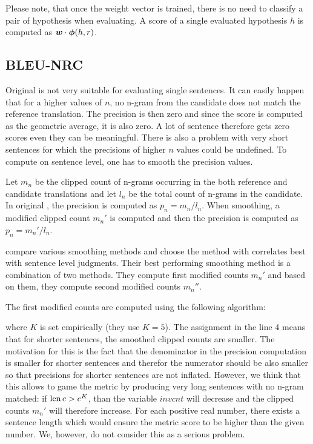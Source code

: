 Please note, that once the weight vector is trained, there is no need to
classify a pair of hypothesis when evaluating. A score of a single evaluated hypothesis $h$
is computed as $\boldsymbol{w} \cdot \boldsymbol{\phi}(h,r)$.



\subsection{BLEU-NRC}

Original  is not very suitable for evaluating single sentences. It
can easily happen that for a higher values of $n$, no n-gram from the candidate
does not match the reference translation. The precision is then zero and since
the  score is computed as the geometric average, it is also zero.
A lot of sentence therefore gets zero scores even they can be meaningful. There
is also a problem with very short sentences for which the precisions of higher
$n$ values could be undefined. To compute  on sentence level, one
has to smooth the precision values.

Let $m_n$ be the clipped count of n-grams occurring in the both reference and
candidate translations and let $l_n$ be the total count of n-grams in the
candidate. In original , the precision is computed as $p_n = m_n /
l_n$. When smoothing, a modified clipped count $m_n'$ is computed and then the
precision is computed as $p_n = m_n' / l_n$. 

 compare various smoothing methods and choose
the method with correlates best with sentence level judgments. Their best
performing smoothing method is a combination of two methods. They compute first
modified counts $m_n'$ and based on them, they compute second modified counts
$m_n''$.

The first modified counts are computed using the following algorithm:
\begin{algorithmic}[1]    
     \Else {} \EndIf \EndFor
\end{algorithmic} where $K$ is set empirically (they use $K = 5$). The
assignment in the line 4 means that for shorter sentences, the smoothed clipped
counts are smaller. The motivation for this is the fact that the denominator in
the precision computation is smaller for shorter sentences and therefor the
numerator should be also smaller so that precisions for shorter sentences are
not inflated. However, we think that this allows to game the metric by
producing very long sentences with no n-gram matched: if $\operatorname{len}{c} > e^K$, than
the variable $invcnt$ will decrease and the clipped counts $m_n'$ will
therefore increase. For each positive real number, there exists a sentence
length which would ensure the metric score to be higher than the given number.
We, however, do not consider this as a serious problem.


